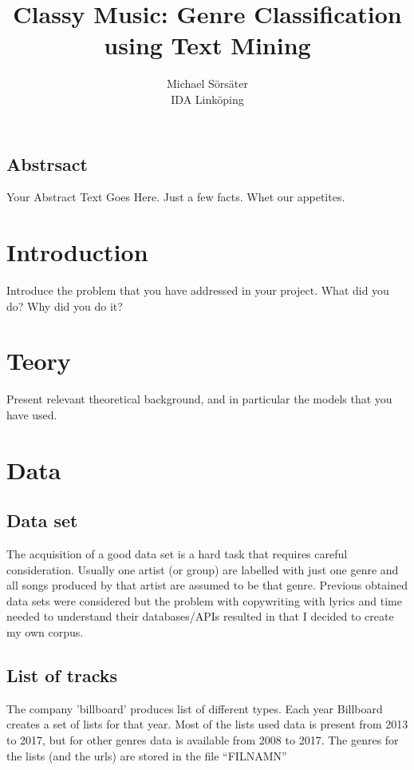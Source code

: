 \documentclass[a4paper, 12pt]{article}
\begin{document}
\date{}

\title{\Large Classy Music: Genre Classification using Text Mining}

\author{
{Michael Sörsäter}\\
IDA Linköping
}

\maketitle


\subsection*{Abstrsact}
Your Abstract Text Goes Here.  Just a few facts.
Whet our appetites.

\section{Introduction}
Introduce the problem that you have addressed in
your project. What did you do? Why did you do it?
\section{Teory}
Present relevant theoretical background, and in particular
the models that you have used.
\section{Data}
\subsection{Data set}
The acquisition of a good data set is a hard task that requires careful consideration.
Usually one artist (or group) are labelled with just one genre and all songs produced by that artist are assumed to be that genre.
Previous obtained data sets were considered but the problem with copywriting with lyrics and time needed to understand their databases/APIs resulted in that I decided to create my own corpus.

\subsection{List of tracks}
The company 'billboard' produces list of different types.
Each year Billboard creates a set of lists for that year.
Most of the lists used data is present from 2013 to 2017, but for other genres data is available from 2008 to 2017.
The genres for the lists (and the urls) are stored in the file ``FILNAMN''
\end{document}
